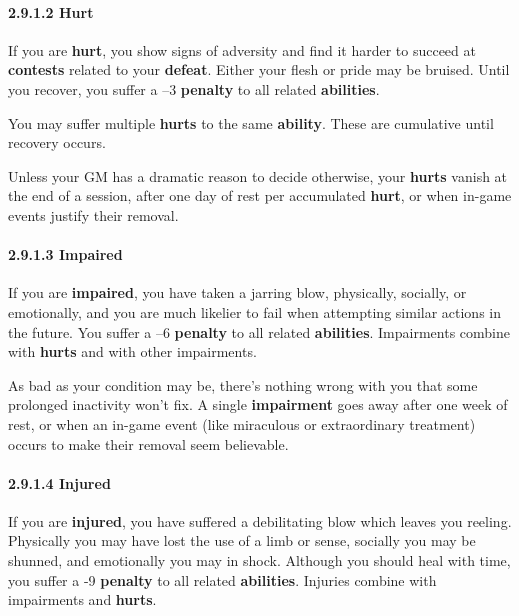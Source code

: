 \documentclass[
]{article}
\begin{document}
\hypertarget{hurt}{%
\paragraph{2.9.1.2 Hurt}\label{hurt}}

If you are \textbf{hurt}, you show signs of adversity and find it harder
to succeed at \textbf{contests} related to your \textbf{defeat}. Either
your flesh or pride may be bruised. Until you recover, you suffer a --3
\textbf{penalty} to all related \textbf{abilities}.

You may suffer multiple \textbf{hurts} to the same \textbf{ability}.
These are cumulative until recovery occurs.

Unless your GM has a dramatic reason to decide otherwise, your
\textbf{hurts} vanish at the end of a session, after one day of rest per
accumulated \textbf{hurt}, or when in-game events justify their removal.

\hypertarget{impaired}{%
\paragraph{2.9.1.3 Impaired}\label{impaired}}

If you are \textbf{impaired}, you have taken a jarring blow, physically,
socially, or emotionally, and you are much likelier to fail when
attempting similar actions in the future. You suffer a --6
\textbf{penalty} to all related \textbf{abilities}. Impairments combine
with \textbf{hurts} and with other impairments.

As bad as your condition may be, there's nothing wrong with you that
some prolonged inactivity won't fix. A single \textbf{impairment} goes
away after one week of rest, or when an in-game event (like miraculous
or extraordinary treatment) occurs to make their removal seem
believable.

\hypertarget{injured}{%
\paragraph{2.9.1.4 Injured}\label{injured}}

If you are \textbf{injured}, you have suffered a debilitating blow which
leaves you reeling. Physically you may have lost the use of a limb or
sense, socially you may be shunned, and emotionally you may in shock.
Although you should heal with time, you suffer a -9 \textbf{penalty} to
all related \textbf{abilities}. Injuries combine with impairments and
\textbf{hurts}.
\end{document}
